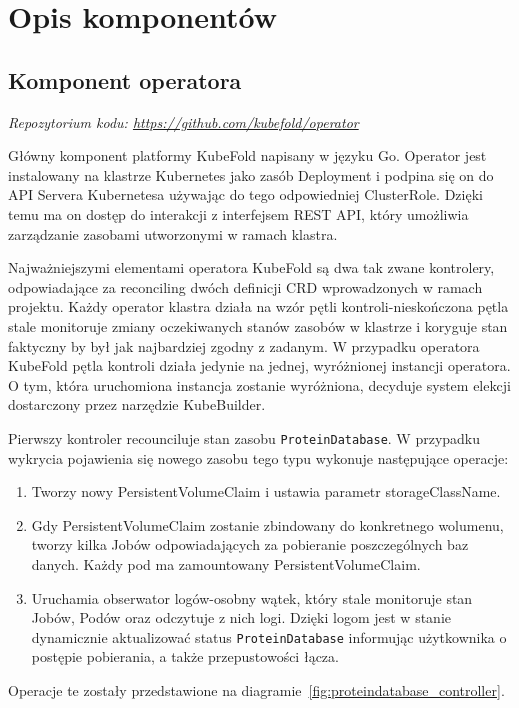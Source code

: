 \section{Opis komponentów}

\subsection{Komponent operatora}\label{subsec:component-operator}
\textit{Repozytorium kodu: \url{https://github.com/kubefold/operator}}

Główny komponent platformy KubeFold napisany w języku Go.
Operator jest instalowany na klastrze Kubernetes jako zasób Deployment i podpina się on do API Servera Kubernetesa używając do tego odpowiedniej ClusterRole.
Dzięki temu ma on dostęp do interakcji z interfejsem REST API, który umożliwia zarządzanie zasobami utworzonymi w ramach klastra.

Najważniejszymi elementami operatora KubeFold są dwa tak zwane kontrolery, odpowiadające za reconciling dwóch definicji CRD wprowadzonych w ramach projektu.
Każdy operator klastra działa na wzór pętli kontroli-nieskończona pętla stale monitoruje zmiany oczekiwanych stanów zasobów w klastrze i koryguje stan faktyczny by był jak najbardziej zgodny z zadanym.
W przypadku operatora KubeFold pętla kontroli działa jedynie na jednej, wyróżnionej instancji operatora.
O tym, która uruchomiona instancja zostanie wyróżniona, decyduje system elekcji dostarczony przez narzędzie KubeBuilder.

Pierwszy kontroler recounciluje stan zasobu \texttt{ProteinDatabase}.
W przypadku wykrycia pojawienia się nowego zasobu tego typu wykonuje następujące operacje:
\begin{enumerate}
    \item Tworzy nowy PersistentVolumeClaim i ustawia parametr storageClassName.
    \item Gdy PersistentVolumeClaim zostanie zbindowany do konkretnego wolumenu, tworzy kilka Jobów odpowiadających za pobieranie poszczególnych baz danych.
    Każdy pod ma zamountowany PersistentVolumeClaim.
    \item Uruchamia obserwator logów-osobny wątek, który stale monitoruje stan Jobów, Podów oraz odczytuje z nich logi.
    Dzięki logom jest w stanie dynamicznie aktualizować status \texttt{ProteinDatabase} informując użytkownika o postępie pobierania, a także przepustowości łącza.
\end{enumerate}
Operacje te zostały przedstawione na diagramie~\ref{fig:proteindatabase_controller}.

